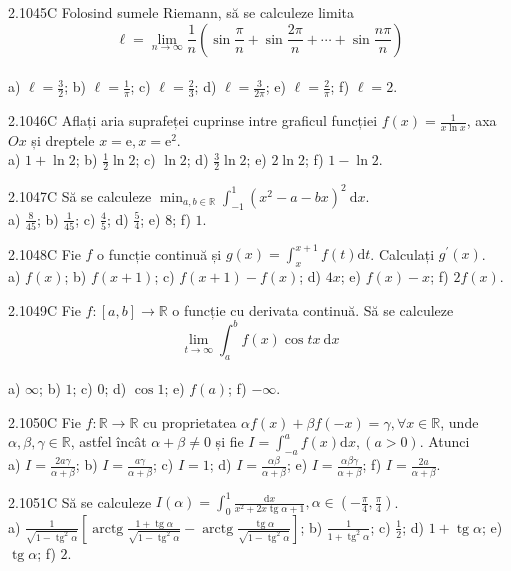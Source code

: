 \documentclass[11pt]{article}
\begin{document}
2.1045C Folosind sumele Riemann, să se calculeze limita $$\ell=\lim _{n \rightarrow \infty} \frac{1}{n}\left(\sin \frac{\pi}{n}+\sin \frac{2 \pi}{n}+\cdots+\sin \frac{n \pi}{n}\right)$$\\ a) $\ell=\frac{3}{2}$; b) $\ell=\frac{1}{\pi}$; c) $\ell=\frac{2}{3}$; d) $\ell=\frac{3}{2 \pi}$; e) $\ell=\frac{2}{\pi}$; f) $\ell=2$.

2.1046C Aflați aria suprafeței cuprinse intre graficul funcției $f(x)=\frac{1}{x \ln x}$, axa $O x$ și dreptele $x=\mathrm{e}, x=\mathrm{e}^{2}$.\\ a) $1+\ln 2$; b) $\frac{1}{2} \ln 2$; c) $\ln 2$; d) $\frac{3}{2} \ln 2$; e) $2 \ln 2$; f) $1-\ln 2$.

2.1047C Să se calculeze $\min _{a, b \in \mathbb{R}} \int_{-1}^{1}\left(x^{2}-a-b x\right)^{2} \mathrm{~d} x$.\\ a) $\frac{8}{45}$; b) $\frac{1}{45}$; c) $\frac{4}{5}$; d) $\frac{5}{4}$; e) $8$; f) $1$.

2.1048C Fie $f$ o funcție continuă și $g(x)=\int_{x}^{x+1} f(t) \mathrm{d} t$. Calculați $g^{\prime}(x)$.\\ a) $f(x)$; b) $f(x+1)$; c) $f(x+1)-f(x)$; d) $4 x$; e) $f(x)-x$; f) $2 f(x)$.

2.1049C Fie $f:[a, b] \rightarrow \mathbb{R}$ o funcție cu derivata continuă. Să se calculeze $$\lim _{t \rightarrow \infty} \int_{a}^{b} f(x) \cos t x \mathrm{~d} x$$\\ a) $\infty$; b) $1$; c) $0$; d) $\cos 1$; e) $f(a)$; f) $-\infty$.

2.1050C Fie $f: \mathbb{R} \rightarrow \mathbb{R}$ cu proprietatea $\alpha f(x)+\beta f(-x)=\gamma, \forall x \in \mathbb{R}$, unde $\alpha, \beta, \gamma \in \mathbb{R}$, astfel încât $\alpha+\beta \neq 0$ și fie $I=\int_{-a}^{a} f(x) \mathrm{d} x,(a>0)$. Atunci\\ a) $I=\frac{2 a \gamma}{\alpha+\beta}$; b) $I=\frac{a \gamma}{\alpha+\beta}$; c) $I=1$; d) $I=\frac{\alpha \beta}{\alpha+\beta}$; e) $I=\frac{\alpha \beta \gamma}{\alpha+\beta}$; f) $I=\frac{2 a}{\alpha+\beta}$.

2.1051C Să se calculeze $I(\alpha)=\int_{0}^{1} \frac{\mathrm{d} x}{x^{2}+2 x \operatorname{tg} \alpha+1}, \alpha \in\left(-\frac{\pi}{4}, \frac{\pi}{4}\right)$.\\ a) $\frac{1}{\sqrt{1-\operatorname{tg}^{2} \alpha}}\left[\operatorname{arctg} \frac{1+\operatorname{tg} \alpha}{\sqrt{1-\operatorname{tg}^{2} \alpha}}-\operatorname{arctg} \frac{\operatorname{tg} \alpha}{\sqrt{1-\operatorname{tg}^{2} \alpha}}\right]$; b) $\frac{1}{1+\operatorname{tg}^{2} \alpha}$; c) $\frac{1}{2}$; d) $1+\operatorname{tg} \alpha$; e) $\operatorname{tg} \alpha$; f) $2$.
\end{document}

